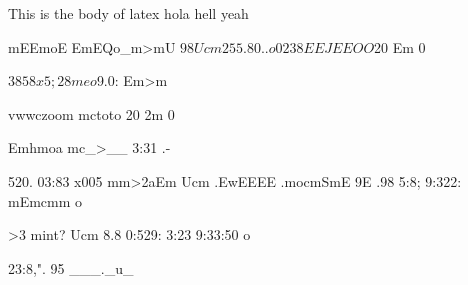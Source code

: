 \documentclass[12pt]{article}
\author{Rose Xu}
\date{\today}
\begin{document}
\maketitle

This is the body of latex hola hell yeah

mEEmoE EmEQo_m>mU
$98 Ucm 255.80.. o

0238 EEJEEOO $20 Em 0

$3858 x5; 28me o
$9.0: Em>m

vwwczoom mctoto 20 2m 0

Emhmoa mc_>__ 3:31 .-

520. 03:83 x005 mm>2aEm
Ucm .EwEEEE .mocmSmE 9E
.98 5:8; 9:322: mEmcmm o

>3 mint? Ucm 8.8
0:529: 3:23 9:33:50 o

23:8,". 95 ___._u_
\end{document}
